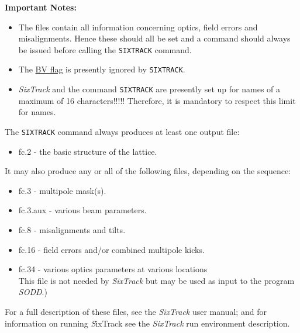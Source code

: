 {\bf Important Notes:}
\begin{itemize} 
\item The files contain all information concerning optics, field errors
 and misalignments. Hence these should all be set and a   
command should always be issued before calling the {\tt SIXTRACK} command.

\item The \hyperref[sec:bvflag]{BV flag} is presently ignored by {\tt SIXTRACK}.

\item \textit{SixTrack} and the \madx command {\tt SIXTRACK} are
  presently set up for names of a maximum of 16 characters!!!!! 
  Therefore, it is mandatory to respect this limit for \madx names.
\end{itemize}



The {\tt SIXTRACK} command always produces at least one output file: 
\begin{itemize}
   \item  fc.2 -  the basic structure of the lattice. 
\end{itemize} 
It may also produce any or all of the following files, depending on the
sequence:
\begin{itemize}
   \item  fc.3 -   multipole mask(s). 
   \item  fc.3.aux -  various beam parameters. 
   \item  fc.8 -   misalignments and tilts. 
   \item  fc.16 -  field errors and/or combined multipole kicks. 
   \item  fc.34 -  various optics parameters at various
     locations \\ This file is not needed by \textit{SixTrack} but may
     be used as input to the program \textit{SODD}\cite{SODD}.)   
\end{itemize}  

For a full description of these files, see the \textit{SixTrack} user
manual\cite{SixTrack}; and for information on running {\textit SixTrack} 
see the \textit{SixTrack} run environment description\cite{SixTrack_RE}.

